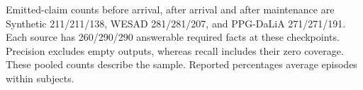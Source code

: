 Emitted-claim counts before arrival, after arrival and after maintenance are Synthetic 211/211/138, WESAD 281/281/207, and PPG-DaLiA 271/271/191. Each source has 260/290/290 answerable required facts at these checkpoints. Precision excludes empty outputs, whereas recall includes their zero coverage. These pooled counts describe the sample. Reported percentages average episodes within subjects.

